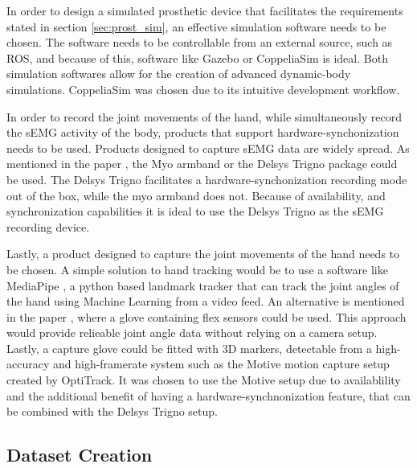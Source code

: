 \documentclass[../main.tex]{subfiles}
\begin{document}
In order to design a simulated prosthetic device that facilitates the requirements stated in section \ref{sec:prost_sim}, an effective simulation software needs to be chosen.
The software needs to be controllable from an external source, such as ROS, and because of this, software like Gazebo \cite{gazebo} or CoppeliaSim \cite{coppeliasim} is ideal.
Both simulation softwares allow for the creation of advanced dynamic-body simulations.
CoppeliaSim \cite{coppeliasim} was chosen due to its intuitive development workflow.

In order to record the joint movements of the hand, while simultaneously record the sEMG activity of the body, products that support hardware-synchonization needs to be used.
Products designed to capture sEMG data are widely spread.
As mentioned in the paper \cite{Zhaolong2021}, the Myo armband \cite{myo} or the Delsys Trigno package \cite{emgworks} could be used.
The Delsys Trigno \cite{emgworks} facilitates a hardware-synchonization recording mode out of the box, while the myo armband \cite{myo} does not.
Because of availability, and synchronization capabilities it is ideal to use the Delsys Trigno as the sEMG recording device.

Lastly, a product designed to capture the joint movements of the hand needs to be chosen.
A simple solution to hand tracking would be to use a software like MediaPipe \cite{mediapipe}, a python based landmark tracker that can track the joint angles of the hand using Machine Learning from a video feed.
An alternative is mentioned in the paper \cite{Zhaolong2021}, where a glove containing flex sensors could be used.
This approach would provide relieable joint angle data without relying on a camera setup.
Lastly, a capture glove could be fitted with 3D markers, detectable from a high-accuracy and high-framerate system such as the Motive motion capture setup \cite{optitrack} created by OptiTrack.
It was chosen to use the Motive setup due to availablility and the additional benefit of having a hardware-synchnonization feature, that can be combined with the Delsys Trigno \cite{emgworks} setup.


\subsection{Dataset Creation}
\label{sec:dataset}
\end{document}
